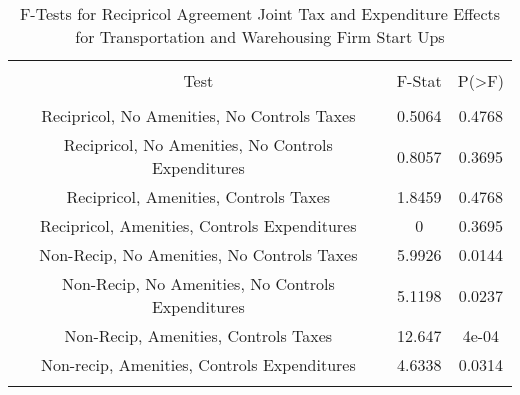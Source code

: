 
\begin{table}[!htbp] \centering 
  \caption{F-Tests for Recipricol Agreement Joint Tax and Expenditure Effects for Transportation and Warehousing Firm Start Ups} 
  \label{48-49Ftests} 
\begin{tabular}{@{\extracolsep{5pt}} ccc} 
\\[-1.8ex]\hline 
\hline \\[-1.8ex] 
Test & F-Stat & P(\textgreater F) \\ 
\hline \\[-1.8ex] 
Recipricol, No Amenities, No Controls Taxes & 0.5064 & 0.4768 \\ 
Recipricol, No Amenities, No Controls Expenditures & 0.8057 & 0.3695 \\ 
Recipricol, Amenities, Controls Taxes & 1.8459 & 0.4768 \\ 
Recipricol, Amenities, Controls Expenditures & 0 & 0.3695 \\ 
Non-Recip, No Amenities, No Controls Taxes & 5.9926 & 0.0144 \\ 
Non-Recip, No Amenities, No Controls Expenditures & 5.1198 & 0.0237 \\ 
Non-Recip, Amenities, Controls Taxes & 12.647 & 4e-04 \\ 
Non-recip, Amenities, Controls Expenditures & 4.6338 & 0.0314 \\ 
\hline \\[-1.8ex] 
\end{tabular} 
\end{table} 
